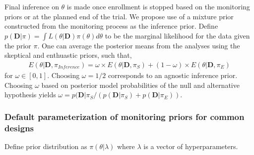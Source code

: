 \documentclass[12pt]{article}
\begin{document}


Final inference on $\theta$ is made once enrollment is stopped based on the monitoring priors or at the planned end of the trial. We propose use of a mixture prior constructed from the monitoring process as the inference prior. Define $p(\mathbf{D}|\pi)=\int L (\theta|\mathbf{D})\pi(\theta)d\theta$ to be the marginal likelihood for the data given the prior $\pi$. One can average the posterior means from the analyses using the skeptical and enthuastic priors, such that,
\begin{align*}
E(\theta|\mathbf{D},\pi_{Inference})=\omega\times E(\theta|\mathbf{D}, \pi_{S})+(1-\omega)\times E(\theta|\mathbf{D}, \pi_{E})
\end{align*}
for $\omega\in[0,1]$. Choosing $\omega=1/2$ corresponds to an agnostic inference prior. Choosing $\omega$ based on posterior model probabilities of the null and alternative hypothesis yields $\omega=p(\mathbf{D}| \pi_{S}/(p(\mathbf{D}| \pi_{S})+p(\mathbf{D}| \pi_{E}))$.
\subsubsection{Default parameterization of monitoring priors for common designs}\label{monitoring_prior_specification}
Define prior distribution as $\pi(\theta|\lambda)$ where $\lambda$ is a vector of hyperparameters.
\end{document}
